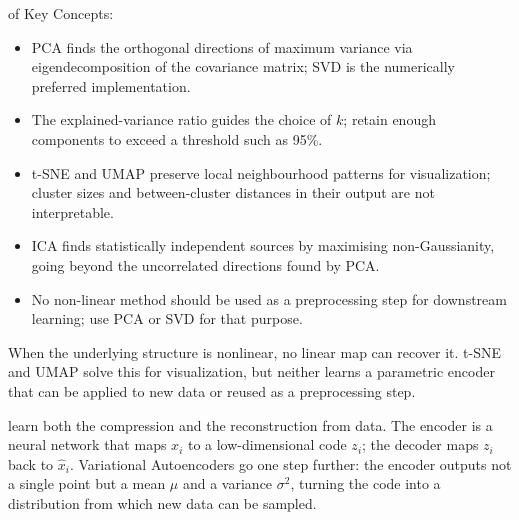  of Key Concepts:
\begin{itemize}
    \item PCA finds the orthogonal directions of maximum variance via eigendecomposition of the covariance matrix; SVD is the numerically preferred implementation.
    \item The explained-variance ratio guides the choice of $k$; retain enough components to exceed a threshold such as 95\%.
    \item t-SNE and UMAP preserve local neighbourhood patterns for visualization; cluster sizes and between-cluster distances in their output are not interpretable.
    \item ICA finds statistically independent sources by maximising non-Gaussianity, going beyond the uncorrelated directions found by PCA.
    \item No non-linear method should be used as a preprocessing step for downstream learning; use PCA or SVD for that purpose.
\end{itemize}


When the underlying structure is nonlinear, no linear map can recover it.
t-SNE and UMAP solve this for visualization, but neither learns a
parametric encoder that can be applied to new data or reused as a
preprocessing step.

 learn both the compression and the
reconstruction from data. The encoder is a neural network that maps
$x_i$ to a low-dimensional code $z_i$; the decoder maps $z_i$ back to
$\hat{x}_i$. Variational Autoencoders go one step further: the encoder
outputs not a single point but a mean $\mu$ and a variance $\sigma^2$,
turning the code into a distribution from which new data can be sampled.

